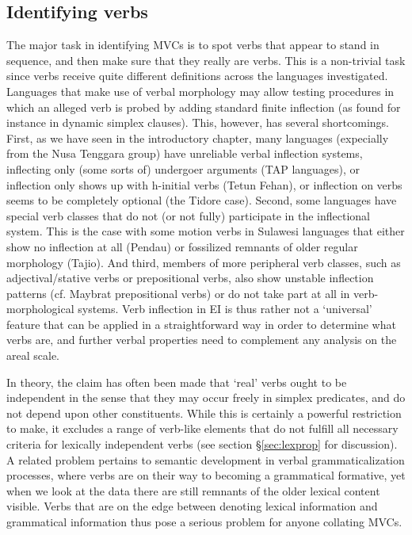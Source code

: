 \subsection{Identifying verbs}\label{sec:identifyingverbs}

The major task in identifying MVCs is to spot verbs that appear to stand in sequence, and then make sure that they really are verbs. This is a non-trivial task since verbs receive quite different definitions across the languages investigated. Languages that make use of verbal morphology may allow testing procedures in which an alleged verb is probed by adding standard finite inflection (as found for instance in dynamic simplex clauses). This, however, has several shortcomings. First, as we have seen in the introductory chapter, many languages (expecially from the Nusa Tenggara group) have unreliable verbal inflection systems, inflecting only (some sorts of) undergoer arguments (TAP languages), or inflection only shows up with h-initial verbs (Tetun Fehan), or inflection on verbs seems to be completely optional (the Tidore case). Second, some languages have special verb classes that do not (or not fully) participate in the inflectional system. This is the case with some motion verbs in Sulawesi languages that either show no inflection at all (Pendau) or fossilized remnants of older regular morphology (Tajio). And third, members of more peripheral verb classes, such as adjectival/stative verbs or prepositional verbs, also show unstable inflection patterns (cf. Maybrat prepositional verbs) or do not take part at all in verb-morphological systems. Verb inflection in EI is thus rather not a `universal' feature that can be applied in a straightforward way in order to determine what verbs are, and further verbal properties need to complement any analysis on the areal scale.

In theory, the claim has often been made that `real' verbs ought to be independent in the sense that they may occur freely in simplex predicates, and do not depend upon other constituents. While this is certainly a powerful restriction to make, it excludes a range of verb-like elements that do not fulfill all necessary criteria for lexically independent verbs (see section §\ref{sec:lexprop} for discussion). A related problem pertains to semantic development in verbal grammaticalization processes, where verbs are on their way to becoming a grammatical formative, yet when we look at the data there are still remnants of the older lexical content visible. Verbs that are on the edge between denoting lexical information and grammatical information thus pose a serious problem for anyone collating MVCs.

